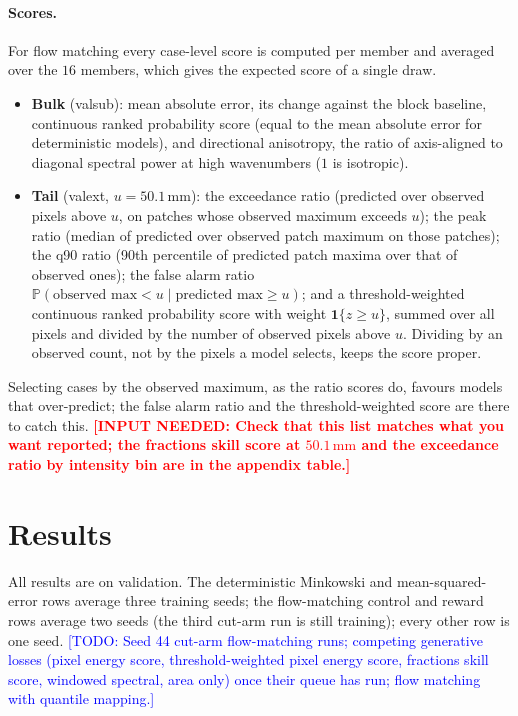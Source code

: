 \documentclass{article}
\newcommand{\needinput}[1]{\textcolor{red}{\textbf{[INPUT NEEDED: #1]}}}
\newcommand{\todo}[1]{\textcolor{blue}{[TODO: #1]}}
\begin{document}
\paragraph{Scores.} For flow matching every case-level score is computed per member and averaged over the $16$
members, which gives the expected score of a single draw.
\begin{itemize}
  \item \textbf{Bulk} (valsub): mean absolute error, its change against the block baseline, continuous ranked
  probability score (equal to the mean absolute error for deterministic models), and directional anisotropy, the ratio
  of axis-aligned to diagonal spectral power at high wavenumbers ($1$ is isotropic).
  \item \textbf{Tail} (valext, $u = 50.1\,\mathrm{mm}$): the exceedance ratio (predicted over observed pixels above
  $u$, on patches whose observed maximum exceeds $u$); the peak ratio (median of predicted over observed patch maximum
  on those patches); the q90 ratio (90th percentile of predicted patch maxima over that of observed ones); the false
  alarm ratio $\mathbb{P}(\text{observed max} < u \mid \text{predicted max} \ge u)$; and a threshold-weighted
  continuous ranked probability score with weight $\mathbf{1}\{z \ge u\}$, summed over all pixels and divided by the
  number of observed pixels above $u$. Dividing by an observed count, not by the pixels a model selects, keeps the
  score proper.
\end{itemize}
Selecting cases by the observed maximum, as the ratio scores do, favours models that over-predict; the false alarm
ratio and the threshold-weighted score are there to catch this. \needinput{Check that this list matches what you want
reported; the fractions skill score at $50.1\,\mathrm{mm}$ and the exceedance ratio by intensity bin are in the
appendix table.}

\section{Results}
\label{sec:results}
All results are on validation. The deterministic Minkowski and mean-squared-error rows average three training seeds;
the flow-matching control and reward rows average two seeds (the third cut-arm run is still training); every other row
is one seed. \todo{Seed 44 cut-arm flow-matching runs; competing generative losses (pixel energy score,
threshold-weighted pixel energy score, fractions skill score, windowed spectral, area only) once their queue has run;
flow matching with quantile mapping.}
\end{document}
